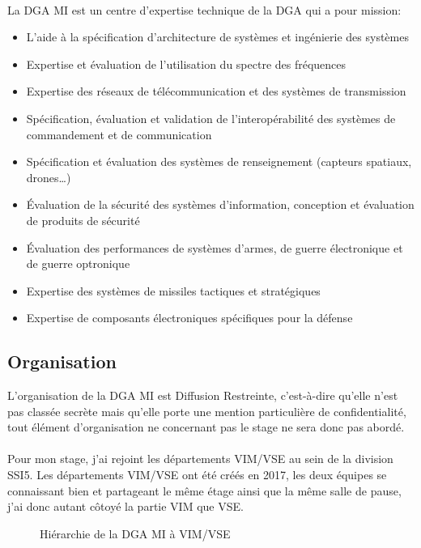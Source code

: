 \documentclass[11pt, book, english, french, standardlists]{upmethodology-document}
\begin{document}
				\paragraph*{}
					La \gls{DGA MI} est un centre d'expertise technique de la \gls{DGA} qui a pour mission:
					\begin{itemize}
						\item L'aide à la spécification d’architecture de systèmes et ingénierie des systèmes
						\item Expertise et évaluation de l’utilisation du spectre des fréquences
						\item Expertise des réseaux de télécommunication et des systèmes de transmission
						\item Spécification, évaluation et validation de l’interopérabilité des systèmes de commandement et de communication
						\item Spécification et évaluation des systèmes de renseignement (capteurs spatiaux, drones\ldots)
						\item Évaluation de la sécurité des systèmes d’information, conception et évaluation de produits de sécurité
						\item Évaluation des performances de systèmes d’armes, de guerre électronique et de guerre optronique
						\item Expertise des systèmes de missiles tactiques et stratégiques
						\item Expertise de composants électroniques spécifiques pour la défense
					\end{itemize}
			\subsection{Organisation}
				\begin{upminfo}
					L'organisation de la \gls{DGA MI} est Diffusion Restreinte, c'est-à-dire qu'elle n'est pas classée secrète mais qu'elle porte une mention particulière de confidentialité, tout élément d'organisation ne concernant pas le stage ne sera donc pas abordé.
				\end{upminfo}
				\paragraph*{}
					Pour mon stage, j'ai rejoint les départements \gls{VIM/VSE} au sein de la division \gls{SSI}5. Les départements \gls{VIM/VSE} ont été créés en 2017, les deux équipes se connaissant bien et partageant le même étage ainsi que la même salle de pause, j'ai donc autant côtoyé la partie VIM que VSE.
				\begin{figure}[H]
					\centering
					\caption{Hiérarchie de la \acrshort{DGA MI} à \acrshort{VIM/VSE}}
					\label{fig:Hiérarchie_DGA_MI_à_VIM}
				\end{figure}
\end{document}
